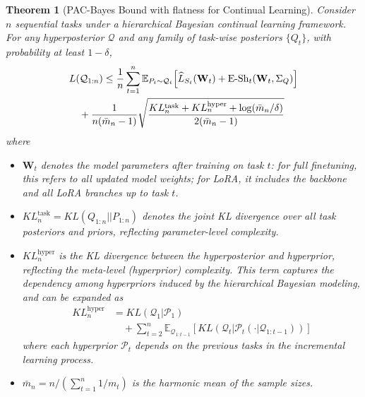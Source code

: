 \documentclass[letterpaper]{article} %
\newtheorem{theorem}{Theorem}
\begin{document}


\begin{theorem}[PAC-Bayes Bound with flatness for Continual Learning]
\label{thm:general-pacbayes}
Consider $n$ sequential tasks under a hierarchical Bayesian continual learning framework. For any hyperposterior $\mathcal{Q}$ and any family of task-wise posteriors $\{Q_t\}$, with probability at least $1-\delta$,
\begin{align}
& L(\mathcal{Q}_{1:n}) \leq \frac{1}{n} \sum_{t=1}^n \mathbb{E}_{P_{t} \sim \mathcal{Q}_{t}} \Big[ \widehat{L}_{S_t}(\mathbf{W}_t) 
+ {\mathrm{E\text{-}Sh}}_t(\mathbf{W}_t, \Sigma_Q) \Big] \notag\\
& \quad  +\frac{1}{n(\bar{m}_n-1)} \sqrt{
\frac{
KL^{\text{task}}_n + KL^{\text{hyper}}_n + \log(\bar{m}_n/\delta)
}{2(\bar{m}_n-1)}
}
\end{align}
where
\begin{itemize}
\item $\mathbf{W}_t$ denotes the model parameters after training on task $t$: for full finetuning, this refers to all updated model weights; for LoRA, it includes the backbone and all LoRA branches up to task $t$.
\item $KL^{\text{task}}_n = KL(Q_{1:n}||P_{1:n})$ denotes the joint KL divergence over all task posteriors and priors, reflecting parameter-level complexity.
\item $KL^{\text{hyper}}_n$ is the KL divergence between the hyperposterior and hyperprior, reflecting the meta-level (hyperprior) complexity. This term captures the dependency among hyperpriors induced by the hierarchical Bayesian modeling, and can be expanded as
$$
\begin{aligned}
    KL^{\text{hyper}}_n
    &=KL(\mathcal{Q}_1 |\mathcal{P}_1)  \\
    & \quad + \sum_{t=2}^n  \mathbb{E}_{\mathcal{Q}_{1:t-1}} [ KL(\mathcal{Q}_t | \mathcal{P}_t(\cdot|\mathcal{Q}_{1:t-1})) ]
\end{aligned}
$$ 
where each hyperprior $\mathcal{P}_t$ depends on the previous tasks in the incremental learning process.
\item $\bar{m}_n = n / (\sum_{t=1}^n 1/m_t)$ is the harmonic mean of the sample sizes.
\end{itemize}
\end{theorem}

\end{document}
